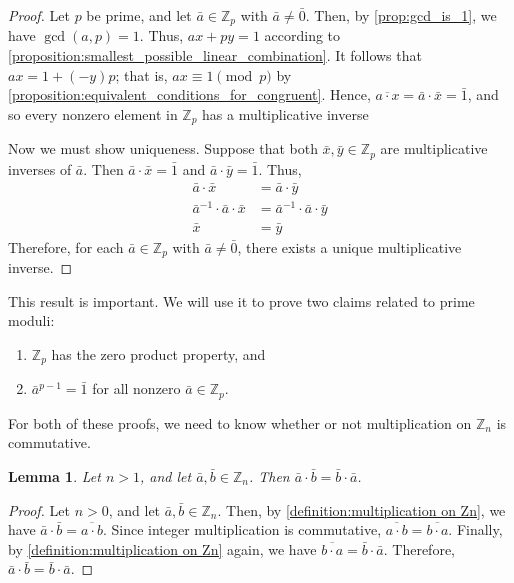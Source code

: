 \documentclass[10pt, titlepage]{amsart}
\newcommand\Z{{\mathbb Z}}
\newtheorem{lemma}{Lemma}[subsection]
\theoremstyle{definition}
\begin{document}
	\begin{proof}
		Let $p$ be prime, and let $\bar{a} \in \Z_p$ with $\bar{a} \neq \bar{0}$. 
		Then, by \cref{prop:gcd_is_1}, we have $\gcd(a,p)=1$.
		Thus, $ax + py = 1$ according to \cref{proposition:smallest_possible_linear_combination}.
		It follows that $ax = 1 + (-y)p$; that is, $ax \equiv 1 \pmod p$ by \cref{proposition:equivalent_conditions_for_congruent}.
		Hence, $\overline{a \cdot x} = \bar{a} \cdot \bar{x} = \bar{1}$, and so every nonzero element in $\Z_p$ has a multiplicative inverse
		
		Now we must show uniqueness.
		Suppose that both $\bar{x}, \bar{y} \in \Z_p$ are multiplicative inverses of $\bar{a}$.
		Then $\bar{a} \cdot \bar{x} = \bar{1}$ and $\bar{a} \cdot \bar{y} = \bar{1}$.
		Thus, 
		\begin{align*}
		\bar{a} \cdot \bar{x} &= \bar{a} \cdot \bar{y} \\
		\bar{a}^{-1} \cdot \bar{a} \cdot \bar{x} &= \bar{a}^{-1} \cdot \bar{a} \cdot \bar{y} \\			
		\bar{x} &= \bar{y}
		\end{align*}
		Therefore, for each $\bar{a} \in \Z_p$ with $\bar{a} \neq \bar{0}$, there exists a unique multiplicative inverse.		
	\end{proof}
	
	\noindent This result is important. We will use it to prove two claims related to prime moduli:
	\begin{enumerate}
		\item $\Z_p$ has the zero product property, and
		\item $\bar{a}^{p-1} = \bar{1}$ for all nonzero $\bar{a} \in \Z_p$.
	\end{enumerate}
	For both of these proofs, we need to know whether or not multiplication on $\Z_n$ is commutative. 
	
	\begin{lemma}\label{lemma:modular_multiplication_is_commutative}
		Let $n > 1$, and let $\bar{a}, \bar{b} \in \Z_n$.
		Then $\bar{a} \cdot \bar{b} = \bar{b} \cdot \bar{a}$.
	\end{lemma}
	
	\begin{proof}
		Let $n > 0$, and let $\bar{a}, \bar{b} \in \Z_n$.
		Then, by \cref{definition:multiplication on Zn}, we have $\bar{a} \cdot \bar{b} = \overline{a \cdot b}$.
		Since integer multiplication is commutative, $\overline{a \cdot b} = \overline{b \cdot a}$.
		Finally, by \cref{definition:multiplication on Zn} again, we have $\overline{b \cdot a} = \bar{b} \cdot \bar{a}$.
		Therefore, $\bar{a} \cdot \bar{b} = \bar{b} \cdot \bar{a}$.
	\end{proof}
	
\end{document}
